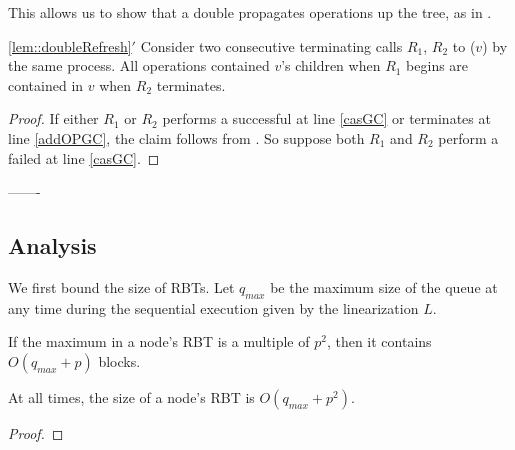 This allows us to show that a double  propagates operations up the tree, 
as in .

\begin{customlemma}{\ref{lem::doubleRefresh}$'$}\label{lem::doubleRefreshGC}
Consider two consecutive terminating calls $R_1$, $R_2$ to ($v$) by the same process.
All operations contained $v$'s children when $R_1$ begins
are contained in $v$ when $R_2$ terminates.
\end{customlemma}
\begin{proof}
If either $R_1$ or $R_2$ performs a successful  at line \ref{casGC} or terminates at line \ref{addOPGC}, the claim follows
from .
So suppose both $R_1$ and $R_2$ perform a failed  at line \ref{casGC}.

\end{proof}





-------

\subsection{Analysis}

We first bound the size of RBTs.  Let $q_{max}$ be the maximum size of the queue at any time during the sequential execution given by the linearization $L$.

\begin{lemma}
If the maximum  in a node's RBT is a multiple of $p^2$, then
it contains $O(q_{max}+p)$ blocks.
\end{lemma}


\begin{corollary}\label{RBTbound}
At all times, the size of a node's RBT is $O(q_{max}+p^2)$. 
\end{corollary}
\begin{proof}

\end{proof}

